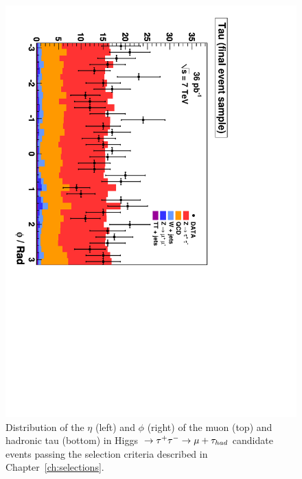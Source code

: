 \begin{figure}
\begin{center}
\includegraphics*[height=0.49\textwidth,angle=90]{results_chapter/figures/replotted_results/plotAHtoMuTauOS_inclusive_finalSamplePlots_tau_Phi_linear.pdf}
\caption[Distributions of the $\eta$ and $\phi$ of the muon and tau candidates in the final selected
events]{Distribution of the $\eta$ (left) and $\phi$ (right) of the muon (top) and hadronic
tau (bottom) in \mbox{Higgs $\to \tau^+\tau^- \to \mu + \tau_{had}$} candidate events passing the
selection criteria described in Chapter~\ref{ch:selections}.}
\label{fig:FinalControlPlotsEtaPhi}
\end{center}
\end{figure} 
%
